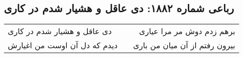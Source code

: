 \begin{center}
\section*{رباعی شماره ۱۸۸۲: دی عاقل و هشیار شدم در کاری}
\label{sec:1882}
\begin{longtable}{l p{0.5cm} r}
دی عاقل و هشیار شدم در کاری
&&
برهم زدم دوش مر مرا عیاری
\\
دیدم که دل آن اوست من اغیارش
&&
بیرون رفتم از آن میان من باری
\\
\end{longtable}
\end{center}
